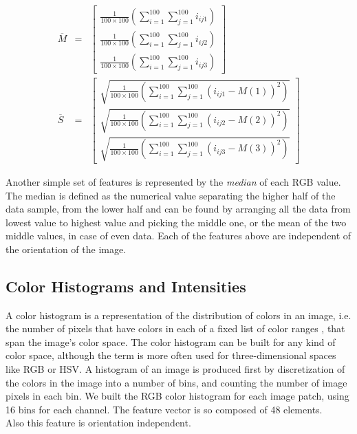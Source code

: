 \begin{eqnarray}
 \overline{M} & = & \left[ \begin{array}{c}
                            \frac{1}{100\times100} \left( \sum_{i=1}^{100} \sum_{j=1}^{100} i_{ij1} \right) \\
                            \frac{1}{100\times100} \left( \sum_{i=1}^{100} \sum_{j=1}^{100} i_{ij2} \right) \\
                            \frac{1}{100\times100} \left( \sum_{i=1}^{100} \sum_{j=1}^{100} i_{ij3} \right)
                           \end{array} \right] \\
 \overline{S} & = & \left[ \begin{array}{c}
                                 \sqrt{\frac{1}{100\times100} \left( \sum_{i=1}^{100} \sum_{j=1}^{100} (i_{ij1} - M(1) )^2 \right)} \\
                                 \sqrt{\frac{1}{100\times100} \left( \sum_{i=1}^{100} \sum_{j=1}^{100} (i_{ij2} - M(2) )^2 \right)} \\
                                 \sqrt{\frac{1}{100\times100} \left( \sum_{i=1}^{100} \sum_{j=1}^{100} (i_{ij3} - M(3) )^2 \right)}
                                \end{array}  \right]
\end{eqnarray}

Another simple set of features is represented by the \textit{median} of each \Gls{RGB} value. The median is defined as the numerical value separating the higher half of the data sample, from the lower half
and can be found by arranging all the data from lowest value to highest value and picking the middle one, or the mean of the two middle values, in case of even data.
Each of the features above are independent of the orientation of the image.



\vspace{0.5cm}

\subsection{Color Histograms and Intensities}

A color histogram is a representation of the distribution of colors in an image, i.e. the number of pixels that have colors in each of a fixed list of color ranges \cite{colorHistogram01},
that span the image's color space. The color histogram can be built for any kind of color space, although the term is more often used for three-dimensional spaces like \Gls{RGB} or \Gls{HSV}.
A histogram of an image is produced first by discretization of the colors in the image into a number of bins, and counting the number of image pixels in each bin.
We built the \Gls{RGB} color histogram for each image patch, using 16 bins for each channel. The feature vector is so composed of 48 elements.\\
Also this feature is orientation independent.


